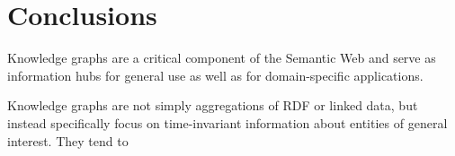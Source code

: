 \section{Conclusions}

Knowledge graphs are a critical component of the Semantic Web and serve as information hubs for general use as well as for domain-specific applications.

Knowledge graphs are not simply aggregations of RDF or linked data, but instead specifically focus on time-invariant information about entities of general interest.
They tend to 